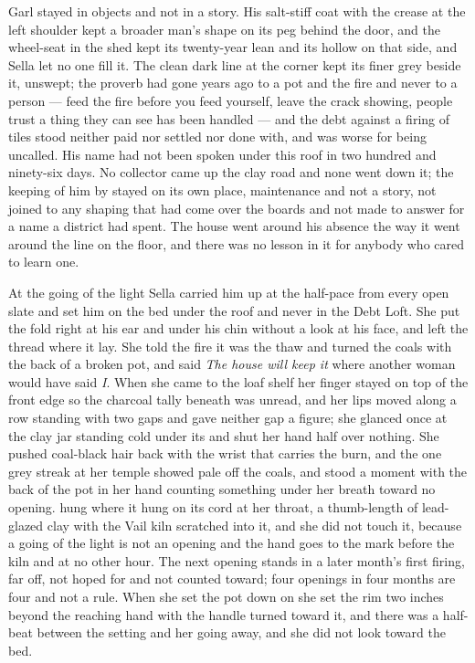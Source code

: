 Garl stayed in objects and not in a story. His salt-stiff coat with the crease at the left shoulder kept a broader man's shape on its peg behind the door, and the wheel-seat in the shed kept its twenty-year lean and its hollow on that side, and Sella let no one fill it. The clean dark line at the corner kept its finer grey beside it, unswept; the proverb had gone years ago to a pot and the fire and never to a person --- feed the fire before you feed yourself, leave the crack showing, people trust a thing they can see has been handled --- and the debt against a firing of tiles stood neither paid nor settled nor done with, and was worse for being uncalled. His name had not been spoken under this roof in two hundred and ninety-six days. No collector came up the clay road and none went down it; the keeping of him by  stayed on its own place, maintenance and not a story, not joined to any shaping that had come over the boards and not made to answer for a name a district had spent. The house went around his absence the way it went around the line on the floor, and there was no lesson in it for anybody who cared to learn one.

\scenebreak

At the going of the light Sella carried him up at the half-pace from every open slate and set him on the bed under the roof and never in the Debt Loft. She put the fold right at his ear and under his chin without a look at his face, and left the thread where it lay. She told the fire it was the thaw and turned the coals with the back of a broken pot, and said \emph{The house will keep it} where another woman would have said \emph{I}. When she came to the loaf shelf her finger stayed on top of the front edge so the charcoal tally beneath was unread, and her lips moved along a row standing with two gaps and gave neither gap a figure; she glanced once at the clay jar standing cold under its  and shut her hand half over nothing. She pushed coal-black hair back with the wrist that carries the burn, and the one grey streak at her temple showed pale off the coals, and stood a moment with the back of the pot in her hand counting something under her breath toward no opening.  hung where it hung on its cord at her throat, a thumb-length of lead-glazed clay with the Vail kiln scratched into it, and she did not touch it, because a going of the light is not an opening and the hand goes to the mark before the kiln and at no other hour. The next opening stands in a later month's first firing, far off, not hoped for and not counted toward; four openings in four months are four and not a rule. When she set the pot down on  she set the rim two inches beyond the reaching hand with the handle turned toward it, and there was a half-beat between the setting and her going away, and she did not look toward the bed.

